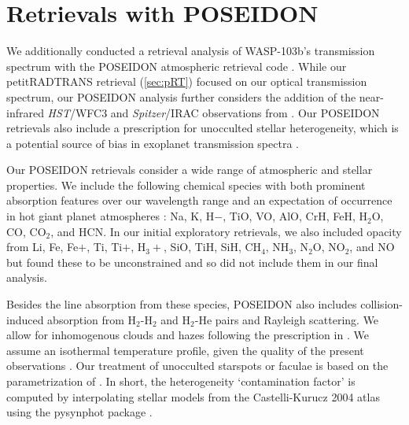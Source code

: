 \documentclass[twocolumn]{aastex63}
\begin{document}
\section{Retrievals with POSEIDON}
\label{sec:POSEIDON}

We additionally conducted a retrieval analysis of WASP-103b's transmission spectrum with the POSEIDON atmospheric retrieval code \citep{MacDonald2017}. While our petitRADTRANS retrieval (\autoref{sec:pRT}) focused on our optical transmission spectrum, our POSEIDON analysis further considers the addition of the near-infrared \textit{HST}/WFC3 and \textit{Spitzer}/IRAC observations from \citet{Kreidberg2018}. Our POSEIDON retrievals also include a prescription for unocculted stellar heterogeneity, which is a potential source of bias in exoplanet transmission spectra \citep[e.g.,][]{McCullough2014,Oshagh2014,Rackham2017,Rackham2018,Rackham2019}.

Our POSEIDON retrievals consider a wide range of atmospheric and stellar properties. We include the following chemical species with both prominent absorption features over our wavelength range and an expectation of occurrence in hot giant planet atmospheres \citep[e.g.][]{Sharp2007,Madhusudhan2016}: Na, K, H${-}$, TiO, VO, AlO, CrH, FeH, H$_2$O, CO, CO$_2$, and HCN. In our initial exploratory retrievals, we also included opacity from Li, Fe, Fe${+}$, Ti, Ti${+}$, H$_3{+}$, SiO, TiH, SiH, CH$_4$, NH$_3$, N$_2$O, NO$_2$, and NO but found these to be unconstrained and so did not include them in our final analysis.

Besides the line absorption from these species, POSEIDON also includes collision-induced absorption from H$_2$-H$_2$ and H$_2$-He pairs and Rayleigh scattering. We allow for inhomogenous clouds and hazes following the prescription in \citet{MacDonald2017}. We assume an isothermal temperature profile, given the quality of the present observations \citep{Rocchetto2016}. Our treatment of unocculted starspots or faculae is based on the parametrization of \citet{Pinhas2018}. In short, the heterogeneity `contamination factor' \citep{Rackham2017} is computed by interpolating stellar models from the Castelli-Kurucz 2004 atlas \citep{Castelli2003} using the pysynphot package \citep{pysynphot}. 
\end{document}
